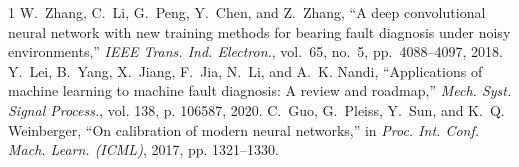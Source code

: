 ﻿\documentclass[journal,10pt,twocolumn]{IEEEtran}
\begin{document}

\begin{thebibliography}{1}
W.~Zhang, C.~Li, G.~Peng, Y.~Chen, and Z.~Zhang, ``A deep convolutional neural network with new training methods for bearing fault diagnosis under noisy environments,'' \emph{IEEE Trans. Ind. Electron.}, vol.~65, no.~5, pp.~4088--4097, 2018.
Y.~Lei, B.~Yang, X.~Jiang, F.~Jia, N.~Li, and A.~K. Nandi, ``Applications of machine learning to machine fault diagnosis: A review and roadmap,'' \emph{Mech. Syst. Signal Process.}, vol. 138, p. 106587, 2020.
C.~Guo, G.~Pleiss, Y.~Sun, and K.~Q. Weinberger, ``On calibration of modern neural networks,'' in \emph{Proc. Int. Conf. Mach. Learn. (ICML)}, 2017, pp. 1321--1330.
\end{thebibliography}
\end{document}
